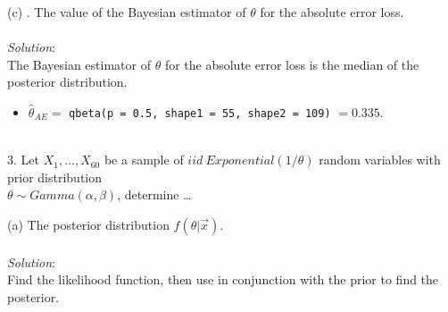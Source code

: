 \documentclass[12pt]{article}
\newcommand{\XB}{\color{black}}
\newcommand{\XBB}{\color{blue}}
\newcommand{\ds}{\displaystyle}
\begin{document}
\vspace{2.5mm}

(c) . The value of the Bayesian estimator of $ \theta $ for the absolute error loss. \\
\vspace{2.5mm} \\
\textit{Solution}:
\vspace{2.5mm} \\

\noindent
The Bayesian estimator of $ \theta $ for the absolute error loss is the median of the posterior distribution. \\

\begin{itemize}
    \item $ \ds \hat{\theta}_{AE} = $ {\XBB \texttt{qbeta(p = 0.5, shape1 = 55, shape2 = 109)}} $ = 0.335 $.
\end{itemize}

\vspace{2.5mm}

\newpage
\XBB\hrulefill\XB \\

3. Let $ X_{1}, \dots , X_{60} $ be a sample of $ iid \ Exponential(1 / \theta) $ random variables
with prior distribution \\ $ \theta \sim Gamma(\alpha, \beta) $, determine \dots \\

\XBB\hrulefill\XB 
\vspace{5mm} 

(a) The posterior distribution $ f(\theta | \overrightarrow{x}) $. \\
\vspace{2.5mm} \\
\textit{Solution}:
\vspace{2.5mm} \\ 

\noindent
Find the likelihood function, then use in conjunction with the prior to find the posterior. \\
\end{document}
